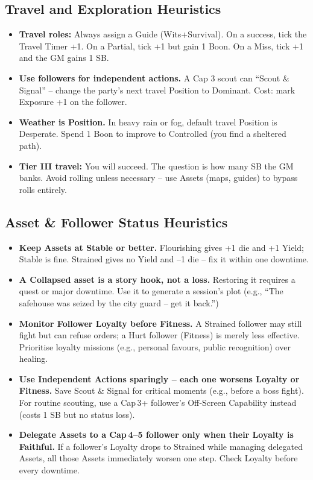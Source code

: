 \documentclass[11pt]{article}
\begin{document}
\subsection*{Travel and Exploration Heuristics}

\begin{itemize}
    \item \textbf{Travel roles:} Always assign a Guide (Wits+Survival). On a success, tick the Travel Timer +1. On a Partial, tick +1 but gain 1 Boon. On a Miss, tick +1 and the GM gains 1 SB.
    \item \textbf{Use followers for independent actions.} A Cap 3 scout can ``Scout \& Signal'' – change the party's next travel Position to Dominant. Cost: mark Exposure +1 on the follower.
    \item \textbf{Weather is Position.} In heavy rain or fog, default travel Position is Desperate. Spend 1 Boon to improve to Controlled (you find a sheltered path).
    \item \textbf{Tier III travel:} You will succeed. The question is how many SB the GM banks. Avoid rolling unless necessary – use Assets (maps, guides) to bypass rolls entirely.
\end{itemize}

\subsection*{Asset \& Follower Status Heuristics}
\begin{itemize}
  \item \textbf{Keep Assets at Stable or better.} Flourishing gives +1 die and +1 Yield; Stable is fine. Strained gives no Yield and –1 die – fix it within one downtime.
  \item \textbf{A Collapsed asset is a story hook, not a loss.} Restoring it requires a quest or major downtime. Use it to generate a session’s plot (e.g., “The safehouse was seized by the city guard – get it back.”)
  \item \textbf{Monitor Follower Loyalty before Fitness.} A Strained follower may still fight but can refuse orders; a Hurt follower (Fitness) is merely less effective. Prioritise loyalty missions (e.g., personal favours, public recognition) over healing.
  \item \textbf{Use Independent Actions sparingly – each one worsens Loyalty or Fitness.} Save Scout \& Signal for critical moments (e.g., before a boss fight). For routine scouting, use a Cap 3+ follower’s Off‑Screen Capability instead (costs 1 SB but no status loss).
  \item \textbf{Delegate Assets to a Cap 4–5 follower only when their Loyalty is Faithful.} If a follower’s Loyalty drops to Strained while managing delegated Assets, all those Assets immediately worsen one step. Check Loyalty before every downtime.
\end{itemize}
\end{document}
